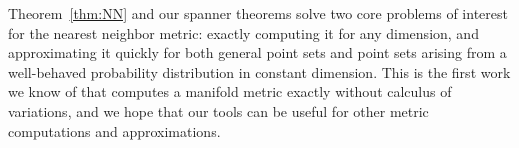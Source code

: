 Theorem~\ref{thm:NN} and our spanner theorems solve two core problems of
interest for the nearest neighbor metric: exactly computing it for any
dimension, and approximating it quickly for both general point sets and
point sets arising from a well-behaved probability distribution in constant
dimension. This is the first work we know of that computes a manifold
metric exactly without calculus of variations, and we hope that our tools
can be useful for other metric computations and approximations.


